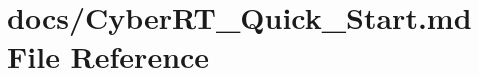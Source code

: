 \hypertarget{CyberRT__Quick__Start_8md}{\section{docs/\-Cyber\-R\-T\-\_\-\-Quick\-\_\-\-Start.md File Reference}
\label{CyberRT__Quick__Start_8md}
}
